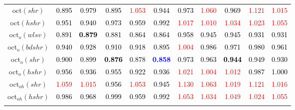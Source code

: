 \begin{tabular}[t]{c|>{}cccc>{}c|ccccc}
oct$(shr)$ & \textcolor{black}{0.895} & \textcolor{black}{0.979} & \textcolor{black}{0.895} & \textcolor{red}{1.053} & \textcolor{black}{0.944} & \textcolor{black}{0.973} & \textcolor{red}{1.060} & \textcolor{black}{0.969} & \textcolor{red}{1.121} & \textcolor{red}{1.015}\\
oct$(hshr)$ & \textcolor{black}{0.951} & \textcolor{black}{0.940} & \textcolor{black}{0.973} & \textcolor{black}{0.959} & \textcolor{black}{0.992} & \textcolor{red}{1.017} & \textcolor{red}{1.010} & \textcolor{red}{1.034} & \textcolor{red}{1.023} & \textcolor{red}{1.055}\\
oct$_o(wlsv)$ & \textcolor{black}{0.891} & \textcolor{black}{\textbf{0.879}} & \textcolor{black}{0.881} & \textcolor{black}{0.864} & \textcolor{black}{0.864} & \textcolor{black}{0.958} & \textcolor{black}{0.945} & \textcolor{black}{0.945} & \textcolor{black}{0.931} & \textcolor{black}{0.931}\\
oct$_o(bdshr)$ & \textcolor{black}{0.940} & \textcolor{black}{0.928} & \textcolor{black}{0.910} & \textcolor{black}{0.918} & \textcolor{black}{0.895} & \textcolor{red}{1.004} & \textcolor{black}{0.986} & \textcolor{black}{0.971} & \textcolor{black}{0.980} & \textcolor{black}{0.961}\\
oct$_o(shr)$ & \textcolor{black}{0.900} & \textcolor{black}{0.899} & \textcolor{black}{\textbf{0.876}} & \textcolor{black}{0.878} & \textcolor{blue}{\textbf{0.858}} & \textcolor{black}{0.973} & \textcolor{black}{0.963} & \textcolor{black}{\textbf{0.944}} & \textcolor{black}{0.949} & \textcolor{black}{0.930}\\
oct$_o(hshr)$ & \textcolor{black}{0.956} & \textcolor{black}{0.936} & \textcolor{black}{0.955} & \textcolor{black}{0.922} & \textcolor{black}{0.936} & \textcolor{red}{1.021} & \textcolor{red}{1.004} & \textcolor{red}{1.012} & \textcolor{black}{0.987} & \textcolor{black}{1.000}\\
oct$_{oh}(shr)$ & \textcolor{red}{1.059} & \textcolor{red}{1.015} & \textcolor{black}{0.956} & \textcolor{red}{1.053} & \textcolor{black}{0.945} & \textcolor{red}{1.130} & \textcolor{red}{1.063} & \textcolor{red}{1.019} & \textcolor{red}{1.121} & \textcolor{red}{1.016}\\
oct$_{oh}(hshr)$ & \textcolor{black}{0.986} & \textcolor{black}{0.968} & \textcolor{black}{0.999} & \textcolor{black}{0.959} & \textcolor{black}{0.992} & \textcolor{red}{1.053} & \textcolor{red}{1.034} & \textcolor{red}{1.049} & \textcolor{red}{1.024} & \textcolor{red}{1.055}\\
\addlinespace[0.3em]

\end{tabular}
